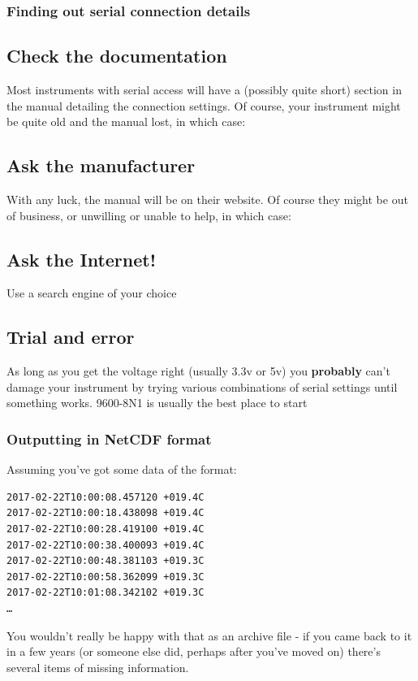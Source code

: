 \documentclass[aspectratio=1610,9pt]{beamer} %
\begin{document}
\begin{frame}
\frametitle{Finding out serial connection
details}

\subsection{Check the
documentation}

Most instruments with serial access will have a (possibly quite short)
section in the manual detailing the connection settings. Of course, your
instrument might be quite old and the manual lost, in which case:

\subsection{Ask the manufacturer}

With any luck, the manual will be on their website. Of course they might
be out of business, or unwilling or unable to help, in which case:

\subsection{Ask the Internet!}

Use a search engine of your choice

\subsection{Trial and error}

As long as you get the voltage right (usually 3.3v or 5v) you
\textbf{probably} can't damage your instrument by trying various
combinations of serial settings until something works. 9600-8N1 is
usually the best place to start

\end{frame}
\begin{frame}[fragile]
\frametitle{Outputting in NetCDF
format}

Assuming you've got some data of the format:

\begin{verbatim}
2017-02-22T10:00:08.457120 +019.4C
2017-02-22T10:00:18.438098 +019.4C
2017-02-22T10:00:28.419100 +019.4C
2017-02-22T10:00:38.400093 +019.4C
2017-02-22T10:00:48.381103 +019.3C
2017-02-22T10:00:58.362099 +019.3C
2017-02-22T10:01:08.342102 +019.3C
…
\end{verbatim}

You wouldn't really be happy with that as an archive file - if you came
back to it in a few years (or someone else did, perhaps after you've
moved on) there's several items of missing information.

\end{frame}
\end{document}

